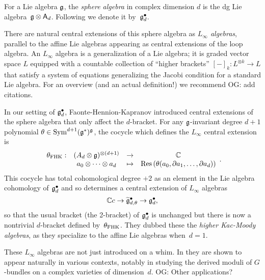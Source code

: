 \documentclass[11pt]{amsart}
\def\owen#1{{\textcolor{violet!65!black}{OG: {#1}}}}
\begin{document}
\begin{dfn}
For a Lie algebra $\mathfrak g$, the {\em sphere algebra} in complex dimension $d$ is the dg Lie algebra~$\mathfrak g \otimes \mathsf A_d$.
Following \cite{FHK} we denote it by~$\mathfrak g^\bullet_d$.
\end{dfn}

There are natural central extensions of this sphere algebra as {\em $L_\infty$ algebras},
parallel to the affine Lie algebras appearing as central extensions of the loop algebra.
An $L_\infty$ algebra is a generalization of a Lie algebra;
it is graded vector space $L$ equipped with a countable collection of ``higher brackets'' $[-]_k \colon L^{\otimes k} \to L$ that satisfy a system of equations generalizing the Jacobi condition for a standard Lie algebra.
For an overview (and an actual definition!) we recommend \owen{add citations}.

In our setting of $\mathfrak g^\bullet_d$, Faonte-Hennion-Kapranov introduced central extensions of the sphere algebra that only affect the $d$-bracket.
For any $\mathfrak g$-invariant degree $d+1$ polynomial $\theta \in \operatorname{Sym}^{d+1}(\mathfrak g^*)^\mathfrak g$, the cocycle which defines the $L_\infty$ central extension is
\[
\label{fhk cocycle}
\begin{array}{cccc}
\theta_{\rm FHK} : & (A_d \otimes \mathfrak g)^{\otimes (d+1)} & \to & \mathbb C\\ 
& a_0 \otimes \cdots \otimes a_d & \mapsto & {\rm Res} \left(\theta(a_0,\partial a_1,\ldots,\partial a_d)\right)
\end{array}.
\]
This cocycle has total cohomological degree $+2$ as an element in the Lie algebra cohomology of $\mathfrak g^\bullet_{d}$ and so determines a central extension of $L_\infty$ algebras
\[
\mathbb C c \to \widetilde{\mathfrak g}^\bullet_{d, \theta} \to \mathfrak g^\bullet_d ,
\]
so that the usual bracket (the 2-bracket) of $\mathfrak g^\bullet_d$ is unchanged but there is now a nontrivial $d$-bracket defined by~$\theta_{\rm FHK}$.
They dubbed these the {\em higher Kac-Moody algebras}, 
as they specialize to the affine Lie algebras when~$d =1$.

These $L_\infty$ algebras are not just introduced on a whim.
In \cite{FHK} they are shown to appear naturally in various contexts,
notably in studying the derived moduli of $G$-bundles on a complex varieties of dimension~$d$.
\owen{Other applications?}
\end{document}
